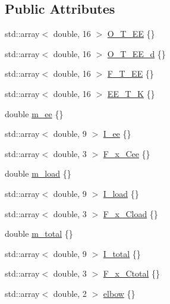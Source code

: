 \subsection*{Public Attributes}
\begin{DoxyCompactItemize}
\item 
std\+::array$<$ double, 16 $>$ \hyperlink{structfranka_1_1RobotState_a193781d47722b32925e0ea7ac415f442}{O\+\_\+\+T\+\_\+\+EE} \{\}
\item 
std\+::array$<$ double, 16 $>$ \hyperlink{structfranka_1_1RobotState_a3e5b4b7687856e92d826044be7d15733}{O\+\_\+\+T\+\_\+\+E\+E\+\_\+d} \{\}
\item 
std\+::array$<$ double, 16 $>$ \hyperlink{structfranka_1_1RobotState_a705b85049fef747008b0eba8284c8057}{F\+\_\+\+T\+\_\+\+EE} \{\}
\item 
std\+::array$<$ double, 16 $>$ \hyperlink{structfranka_1_1RobotState_aeb78a3b4b76d4f57b9898cbea3a0f7aa}{E\+E\+\_\+\+T\+\_\+K} \{\}
\item 
double \hyperlink{structfranka_1_1RobotState_af982a16246e33c1495ec02972a36bce3}{m\+\_\+ee} \{\}
\item 
std\+::array$<$ double, 9 $>$ \hyperlink{structfranka_1_1RobotState_a74cee1beb5d400694133deea2846e611}{I\+\_\+ee} \{\}
\item 
std\+::array$<$ double, 3 $>$ \hyperlink{structfranka_1_1RobotState_a907c4561d8f1c1a2af7980cf58ceb112}{F\+\_\+x\+\_\+\+Cee} \{\}
\item 
double \hyperlink{structfranka_1_1RobotState_a99ea4ab9c5a42a5c17365ed8fd730cd1}{m\+\_\+load} \{\}
\item 
std\+::array$<$ double, 9 $>$ \hyperlink{structfranka_1_1RobotState_a5b194153497eff98049681f852118f82}{I\+\_\+load} \{\}
\item 
std\+::array$<$ double, 3 $>$ \hyperlink{structfranka_1_1RobotState_a48e921e6215ad32f36e424b4d7b66a89}{F\+\_\+x\+\_\+\+Cload} \{\}
\item 
double \hyperlink{structfranka_1_1RobotState_a87880d4693c8f576ebdabf00f4d4f981}{m\+\_\+total} \{\}
\item 
std\+::array$<$ double, 9 $>$ \hyperlink{structfranka_1_1RobotState_ad9120ae7b7613e77df8c1c3eba8fb033}{I\+\_\+total} \{\}
\item 
std\+::array$<$ double, 3 $>$ \hyperlink{structfranka_1_1RobotState_a72ee7362018e3c9e95e3c41e857bfd8d}{F\+\_\+x\+\_\+\+Ctotal} \{\}
\item 
std\+::array$<$ double, 2 $>$ \hyperlink{structfranka_1_1RobotState_a43485841c427d70e7f36a912cc3116d1}{elbow} \{\}

\end{DoxyCompactItemize}
